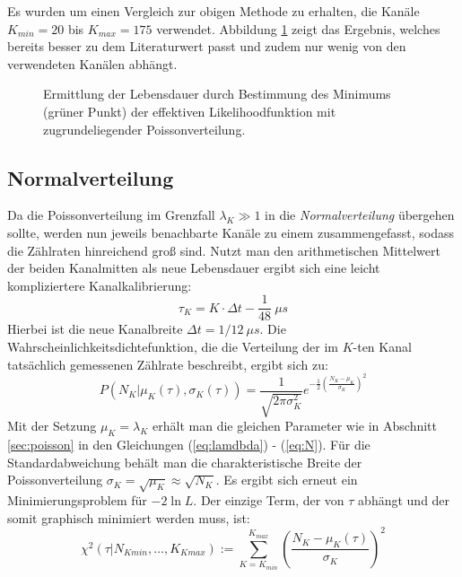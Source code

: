 		Es wurden um einen Vergleich zur obigen Methode zu erhalten, die Kanäle $K_{min} = 20$ bis $K_{max} = 175$ verwendet. Abbildung \ref{fig:LDpoisson} zeigt das Ergebnis, welches bereits besser zu dem Literaturwert passt und zudem nur wenig von den verwendeten Kanälen abhängt.
		\begin{figure}[hp]
		      			\centering
		      			\captionsetup{justification=centering}
		      			\caption{Ermittlung der Lebensdauer durch Bestimmung des Minimums (grüner Punkt) der effektiven Likelihoodfunktion mit zugrundeliegender Poissonverteilung.}
		      			\label{fig:LDpoisson}
		\end{figure}
   \subsection{Normalverteilung}	
   Da die Poissonverteilung im Grenzfall $\lambda_K \gg 1$ in die \textit{Normalverteilung} übergehen sollte, werden nun jeweils benachbarte Kanäle zu einem zusammengefasst, sodass die Zählraten hinreichend groß sind. Nutzt man den arithmetischen Mittelwert der beiden Kanalmitten als neue Lebensdauer ergibt sich eine leicht kompliziertere Kanalkalibrierung:
   		\begin{equation}
   				\tau_K = K \cdot \Delta t - \frac{1}{48}\ \unit{\mu s}	
   		\end{equation} 
   Hierbei ist die neue Kanalbreite $\Delta t = 1/12\ \unit{\mu s}$. Die Wahrscheinlichkeitsdichtefunktion, die die Verteilung der im $K$-ten Kanal tatsächlich gemessenen Zählrate beschreibt, ergibt sich zu:
   		\begin{equation}
      			P(N_K|\mu_K(\tau),\sigma_K(\tau)) = \frac{1}{\sqrt{2\pi\sigma_K^2}}e^{-\frac{1}{2}\left(\frac{N_K- \mu_K}{\sigma_K}\right)^2}	
      	\end{equation} 
    Mit der Setzung $\mu_K = \lambda_K$ erhält man die gleichen Parameter wie in Abschnitt \ref{sec:poisson} in den Gleichungen (\ref{eq:lamdbda}) - (\ref{eq:N}). Für die Standardabweichung behält man die charakteristische Breite der Poissonverteilung $\sigma_K = \sqrt{\mu_K} \approx\sqrt{N_K}$.
    Es ergibt sich erneut ein Minimierungsproblem für $-2\ln L$. Der einzige Term, der von $\tau$ abhängt und der somit graphisch minimiert werden muss, ist:
    	\begin{equation}
          	\chi^2(\tau|N_{Kmin},\dots,K_{Kmax}) := \sum_{K = K_{min}}^{K_{max}} \left(\frac{N_K - \mu_K(\tau)}{\sigma_K}\right)^2	
         \end{equation}
